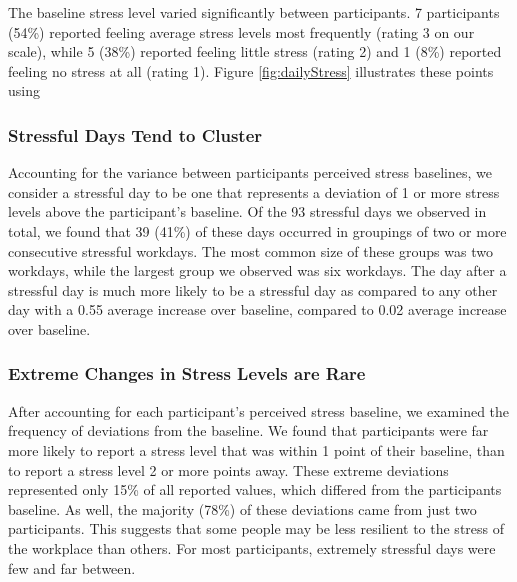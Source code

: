 The baseline stress level varied significantly between participants. 7
participants (54\%) reported feeling average stress levels most frequently
(rating 3 on our scale), while 5 (38\%) reported feeling little stress
(rating 2) and 1 (8\%) reported feeling no stress at all (rating 1). Figure \ref{fig:dailyStress} illustrates these points using 


\subsubsection{Stressful Days Tend to Cluster}
Accounting for the variance between participants perceived stress
baselines, we consider a stressful day to be one that represents a
deviation of 1 or more stress levels above the participant's
baseline. Of the 93 stressful days we observed in total, we found that
39 (41\%) of these days occurred in groupings of two or more
consecutive stressful workdays. The most common size of these groups
was two workdays, while the largest group we observed was six
workdays.  The day after a stressful day is much more likely to be a
stressful day as compared to any other day with a 0.55 average increase
over baseline, compared to 0.02 average increase over baseline.

\subsubsection{Extreme Changes in Stress Levels are Rare}
After accounting for each participant's perceived stress baseline, we
examined the frequency of deviations from the baseline. We found that
participants were far more likely to report a stress level that was
within 1 point of their baseline, than to report a stress level 2 or
more points away. These extreme deviations represented only 15\% of
all reported values, which differed from the participants baseline. As
well, the majority (78\%) of these deviations came from just two
participants. This suggests that some people may be less resilient to
the stress of the workplace than others. For most participants,
extremely stressful days were few and far between.

